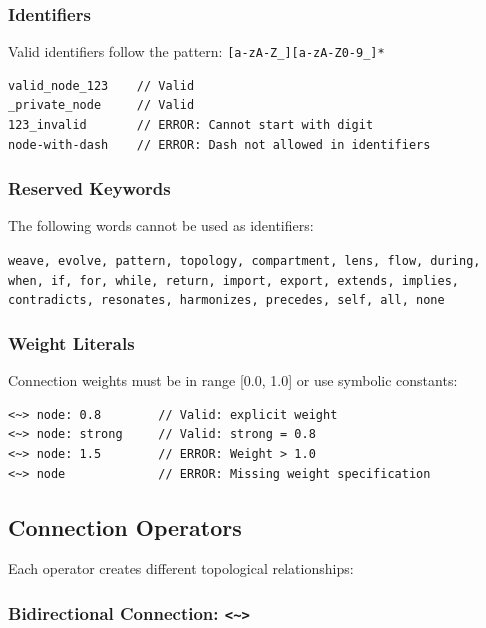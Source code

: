 \documentclass[12pt,a4paper,openany]{book} %
\begin{document}
\subsubsection{Identifiers}

Valid identifiers follow the pattern: \texttt{[a-zA-Z\_][a-zA-Z0-9\_]*}

\vspace{0.5em}
\begin{lstlisting}[language=loom]
valid_node_123    // Valid
_private_node     // Valid
123_invalid       // ERROR: Cannot start with digit
node-with-dash    // ERROR: Dash not allowed in identifiers
\end{lstlisting}
\vspace{0.5em}

\subsubsection{Reserved Keywords}

The following words cannot be used as identifiers:

\texttt{weave, evolve, pattern, topology, compartment, lens, flow, during, when, if, for, while, return, import, export, extends, implies, contradicts, resonates, harmonizes, precedes, self, all, none}

\subsubsection{Weight Literals}

Connection weights must be in range [0.0, 1.0] or use symbolic constants:

\vspace{0.5em}
\begin{lstlisting}[language=loom]
<~> node: 0.8        // Valid: explicit weight
<~> node: strong     // Valid: strong = 0.8
<~> node: 1.5        // ERROR: Weight > 1.0
<~> node             // ERROR: Missing weight specification
\end{lstlisting}
\vspace{0.5em}

\subsection{Connection Operators}

Each operator creates different topological relationships:

\subsubsection{Bidirectional Connection: \texttt{<\textasciitilde{}>}}
\end{document}
